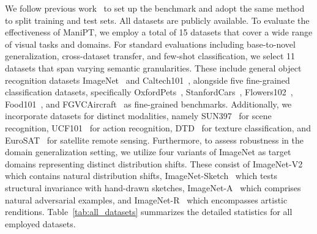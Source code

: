 \documentclass{article}
\theoremstyle{plain}
\theoremstyle{definition}
\theoremstyle{remark}
\begin{document}
	We follow previous work~\citep{zhou2022coop} to set up the benchmark and adopt the same method to split training and test sets. All datasets are publicly available. To evaluate the effectiveness of ManiPT, we employ a total of 15 datasets that cover a wide range of visual tasks and domains. For standard evaluations including base-to-novel generalization, cross-dataset transfer, and few-shot classification, we select 11 datasets that span varying semantic granularities. These include general object recognition datasets ImageNet~\citep{deng2009imagenet} and Caltech101~\citep{fei2004caltech101}, alongside five fine-grained classification datasets, specifically OxfordPets~\citep{parkhi2012oxfordpets}, StanfordCars~\citep{krause2013stanfordcars}, Flowers102~\citep{nilsback2008flowers102}, Food101~\citep{bossard2014food101}, and FGVCAircraft~\citep{maji2013fgvcaircraft} as fine-grained benchmarks. Additionally, we incorporate datasets for distinct modalities, namely SUN397~\citep{xiao2010sun397} for scene recognition, UCF101~\citep{soomro2012ucf101} for action recognition, DTD~\citep{cimpoi2014dtd} for texture classification, and EuroSAT~\citep{helber2019eurosat} for satellite remote sensing. Furthermore, to assess robustness in the domain generalization setting, we utilize four variants of ImageNet as target domains representing distinct distribution shifts. These consist of ImageNet-V2~\citep{recht2019imagenetv2} which contains natural distribution shifts, ImageNet-Sketch~\citep{wang2019imagenetsketch} which tests structural invariance with hand-drawn sketches, ImageNet-A~\citep{hendrycks2021imageneta} which comprises natural adversarial examples, and ImageNet-R~\citep{hendrycks2021imagenetr} which encompasses artistic renditions. Table~\ref{tab:all_datasets} summarizes the detailed statistics for all employed datasets.
\end{document}
